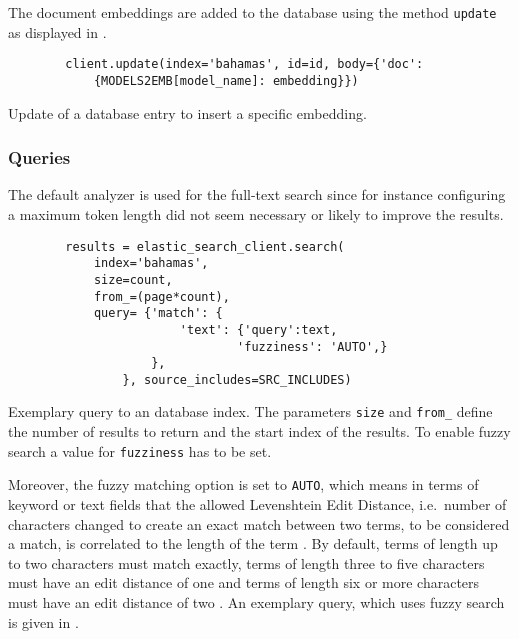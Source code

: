 The document embeddings are added to the database using the method \texttt{update} as displayed in .

\begin{listing}[htp]
    \begin{verbatim}
        client.update(index='bahamas', id=id, body={'doc': 
            {MODELS2EMB[model_name]: embedding}})
    \end{verbatim}
    \caption[Update of a database entry]
    {Update of a database entry to insert a specific embedding.
    }
    \label{lst:db_Pool_update}
\end{listing}


\subsubsection*{Queries}
The default analyzer is used for the full-text search since for instance configuring a maximum token length did not seem necessary or likely to improve the results.

\begin{listing}[htp]
    \begin{verbatim}
        results = elastic_search_client.search(
            index='bahamas', 
            size=count,
            from_=(page*count),
            query= {'match': {
                        'text': {'query':text,
                                'fuzziness': 'AUTO',}
                    }, 
                }, source_includes=SRC_INCLUDES)
    \end{verbatim}
    \caption[Query to an \databaseName{} database index]{Exemplary query to an \databaseName{} database index.
    The parameters \texttt{size} and \texttt{from\_} define the number of results to return and the start index of the results.
    To enable fuzzy search a value for \texttt{fuzziness} has to be set. 
    }
    \label{lst:fuzzy_query}
\end{listing}

Moreover, the fuzzy matching option is set to \texttt{AUTO}, which means in terms of keyword or text fields that the allowed Levenshtein Edit Distance, 
i.e.\ number of characters changed to create an exact match between two terms, to be considered a match, is correlated to the length of the term \cite{Elasticsearch-fuzziness}.
By default, terms of length up to two characters must match exactly, terms of length three to five characters must have an edit distance of one and 
terms of length six or more characters must have an edit distance of two \cite{Elasticsearch-fuzziness}.
An exemplary query, which uses fuzzy search is given in .

